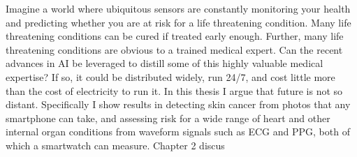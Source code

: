 Imagine a world where ubiquitous sensors are constantly monitoring your health and predicting whether you are at risk for a life threatening condition.  Many life threatening conditions can be cured if treated early enough.  Further, many life threatening conditions are obvious to a trained medical expert.  Can the recent advances in AI be leveraged to distill some of this highly valuable medical expertise?  If so, it could be distributed widely, run 24/7, and cost little more than the cost of electricity to run it.  In this thesis I argue that future is not so distant.  Specifically I show results in detecting skin cancer from photos that any smartphone can take, and assessing risk for a wide range of heart and other internal organ conditions from waveform signals such as ECG and PPG, both of which a smartwatch can measure.
Chapter 2 discus